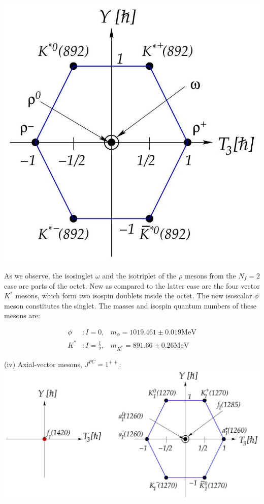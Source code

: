 \documentclass[10pt, letterpaper]{article}
\begin{document}
\includegraphics[scale=0.3, center]{2025_05_20_8618f55a41bfe980b4b2g-70(1)}

As we observe, the isosinglet $\omega$ and the isotriplet of the $\rho$ mesons from the $N_{f}=2$ case are parts of the octet. New as compared to the latter case are the four vector $K^{*}$ mesons, which form two isospin doublets inside the octet. The new isoscalar $\phi$ meson constitutes the singlet. The masses and isospin quantum numbers of these mesons are:

$$
\begin{array}{rll}
\phi & : I=0, & m_{\phi}=1019.461 \pm 0.019 \mathrm{MeV} \\
K^{*} & : I=\frac{1}{2}, & m_{K^{*}}=891.66 \pm 0.26 \mathrm{MeV}
\end{array}
$$

(iv) Axial-vector mesons, $J^{P C}=1^{++}$:\\
\includegraphics[scale=0.3, center]{2025_05_20_8618f55a41bfe980b4b2g-71}
\end{document}
